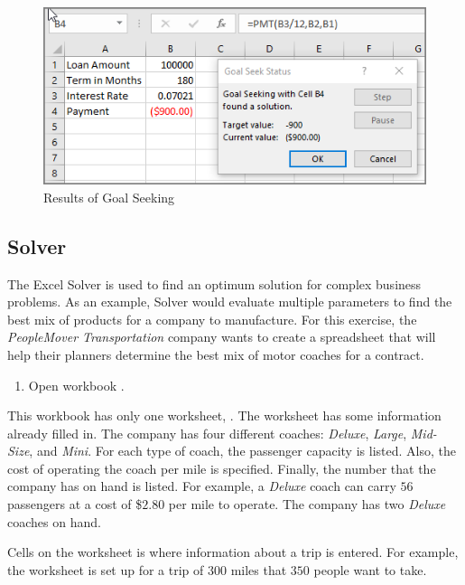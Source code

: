 \begin{figure}[H]
	\centering
	\includegraphics[width=\maxwidth{.95\linewidth}]{gfx/ch08_fig34}
	\caption{Results of Goal Seeking}
	\label{08:fig34}
\end{figure}

\subsection{Solver}

The Excel Solver is used to find an optimum solution for complex business problems. As an example, Solver would evaluate multiple parameters to find the best mix of products for a company to manufacture. For this exercise, the \textit{PeopleMover Transportation} company wants to create a spreadsheet that will help their planners determine the best mix of motor coaches for a contract.

\begin{enumerate}
	\item Open workbook .
\end{enumerate}

This workbook has only one worksheet, . The worksheet has some information already filled in. The company has four different coaches: \textit{Deluxe}, \textit{Large}, \textit{Mid-Size}, and \textit{Mini}. For each type of coach, the passenger capacity is listed. Also, the cost of operating the coach per mile is specified. Finally, the number that the company has on hand is listed. For example, a \textit{Deluxe} coach can carry $ 56 $ passengers at a cost of \$$ 2.80 $ per mile to operate. The company has two \textit{Deluxe} coaches on hand.

Cells  on the worksheet is where information about a trip is entered. For example, the worksheet is set up for a trip of $ 300 $ miles that $ 350 $ people want to take.

